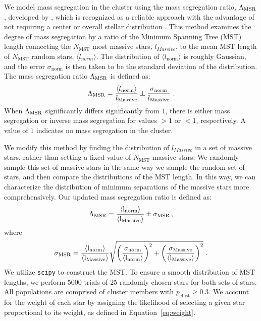 \documentclass[12pt]{ucsddissertation}
\newcommand{\pclust}{p_{\mathrm{clust}}}
\begin{document}
\begin{CJK*}{UTF8}{gbsn}
We model mass segregation in the cluster using the
mass segregation ratio, $\Lambda_{\rm MSR}$, developed by \citet{Allison-2009}, which is recognized as a reliable approach with the advantage of not requiring a center or overall stellar distribution \citep[see][for further discussions]{Parker-2015}. This method examines the degree of mass segregation by a ratio of the Minimum Spanning Tree (MST) length connecting the $N_\mathrm{MST}$ most massive stars, $l_{Massive}$, to the mean MST length of $N_\mathrm{MST}$ random stars, $\langle l_{norm} \rangle$. The distribution of $\langle l_\mathrm{norm} \rangle$ is roughly Gaussian, and the error $\sigma_\mathrm{norm}$ is then taken to be the standard deviation of the distribution. 
The mass segregation ratio $\Lambda_\mathrm{\rm MSR}$ is defined as:
\begin{equation}
     \Lambda_\mathrm{\rm MSR} = \frac{\langle l_\mathrm{norm} \rangle}{l_\mathrm{Massive}} \pm \frac{\sigma_\mathrm{norm}}{l_\mathrm{Massive}}~.
\end{equation}
When $\rm \Lambda_{\rm MSR}$ significantly differs significantly from $1$, there is either mass segregation or inverse mass segregation for values $> 1$ or $< 1$, respectively. A value of $1$ indicates no mass segregation in the cluster.  

We modify this method by finding the distribution of $l_{Massive}$ in a set of massive stars, rather than setting a fixed value of $N_\mathrm{MST}$ massive stars. We randomly sample this set of massive stars in the same way we sample the random set of stars, and then compare the distributions of the MST length. In this way, we can characterize the distribution of minimum separations of the massive stars more comprehensively.  Our updated mass segregation ratio is defined as:
\begin{equation}
        \rm \Lambda_\mathrm{\rm MSR} = \frac{\langle l_\mathrm{norm} \rangle}{\langle l_\mathrm{Massive} \rangle} \pm \sigma_\mathrm{\rm MSR}\,,
\end{equation}
where
\begin{equation}
        \rm \sigma_{\rm MSR} = \frac{\langle l_{norm} \rangle}{\langle l_{Massive} \rangle}     \sqrt{\bigg(\frac{\sigma_{norm}}{\langle l_{norm} \rangle}\bigg)^2 + \bigg(\frac{\sigma_{Massive}}{\langle l_{Massive} \rangle}\bigg)^2}~.
\end{equation}
We utilize \texttt{scipy} to construct the MST. To ensure a smooth distribution of MST lengths, we perform $5000$ trials of $25$ randomly chosen stars for both sets of stars. All populations are comprised of cluster members with $\pclust \geq 0.3$. We account for the weight of each star by assigning the likelihood of selecting a given star proportional to its weight, as defined in Equation~\eqref{eq:weight}. 


\end{CJK*}
\end{document}
